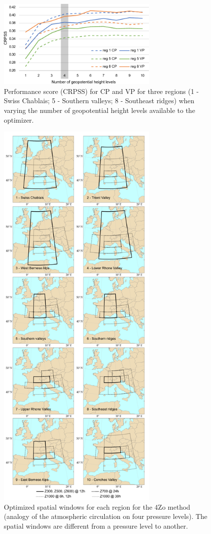 \documentclass[review]{elsarticle}
\begin{document}
\begin{figure}[t]
	\centerline{\includegraphics[width=7.9cm]{fig02.pdf}}
	\caption{Performance score (CRPSS) for CP and VP for three regions (1 - Swiss Chablais; 5 - Southern valleys; 8 - Southeast ridges) when varying the number of geopotential height levels available to the optimizer.}
	\label{fig:figure_nb_levels}
\end{figure}

\begin{figure}[t]
	\centerline{\includegraphics[width=7.9cm]{fig03.pdf}}
	\caption{Optimized spatial windows for each region for the 4Zo method (analogy of the atmospheric circulation on four pressure levels). The spatial windows are different from a pressure level to another.}
	\label{fig:spatial_windows_4Zo}
\end{figure}
\end{document}
